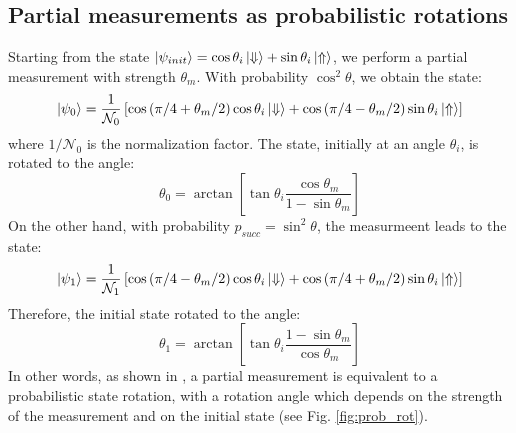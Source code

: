 \subsection{Partial measurements as probabilistic rotations}
Starting from the state $\left|\psi_{init}\right> =  \cos\theta_i \left|\Downarrow\right>+ \sin\theta_i \left|\Uparrow\right> $, we perform a partial measurement with strength $\theta_m$. With probability $\cos^2\theta$, we obtain the state:
\begin{equation}
 \left|\psi_0\right> = \frac{1}{\mathcal{N}_0} \left[ \cos \left( \pi/4 + \theta_m/2 \right) \cos\theta_i \left|\Downarrow\right> +  \cos \left( \pi/4 - \theta_m/2 \right) \sin\theta_i \left|\Uparrow\right> \right]
\end{equation}
where $1/\mathcal{N}_0$ is the normalization factor. The state, initially at an angle $\theta_i$, is rotated to the angle:
\begin{equation}
 \theta_0 = \arctan{ \left[ \tan\theta_i \frac{\cos\theta_m}{1-\sin\theta_m} \right]}
\end{equation}
On the other hand, with probability $p_{succ} = \sin^2\theta$, the measurmeent leads to the state:
\begin{equation}
 \left|\psi_1\right> = \frac{1}{\mathcal{N}_1} \left[ \cos \left( \pi/4 - \theta_m/2 \right) \cos\theta_i \left|\Downarrow\right> +  \cos \left( \pi/4 + \theta_m/2 \right) \sin\theta_i \left|\Uparrow\right> \right]
\end{equation}
Therefore, the initial state rotated to the angle:
\begin{equation}
 \theta_1 = \arctan{ \left[ \tan\theta_i \frac{1-\sin\theta_m}{\cos\theta_m} \right]}
\end{equation}
In other words, as shown in \cite{Jordan_PRB_2006}, a partial measurement is equivalent to a probabilistic state rotation, with a rotation angle which depends on the strength of the measurement and on the initial state (see Fig. \ref{fig:prob_rot}).

